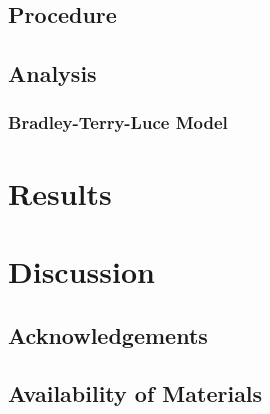 \documentclass[a4paper, natbib, doc, 12pt]{apa7}
\begin{document}
\subsection{Procedure}

\subsection{Analysis}




\subsubsection{Bradley-Terry-Luce Model}%
\label{ssub:Bradley-Terry-Luce Model}


\section{Results}


\section{Discussion}


















\subsection*{Acknowledgements}
\subsection*{Availability of Materials}
\newpage

\end{document}
